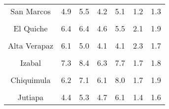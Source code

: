 \begin{tabular}[t]{ccccccc}
San Marcos & 4.9 & 5.5 & 4.2 & 5.1 & 1.2 & 1.3\\
\cellcolor[HTML]{B6B3FF}{Huehuetenango} & \cellcolor[HTML]{B6B3FF}{8.8} & \cellcolor[HTML]{B6B3FF}{9.4} & \cellcolor[HTML]{B6B3FF}{6.5} & \cellcolor[HTML]{B6B3FF}{7.8} & \cellcolor[HTML]{B6B3FF}{2.4} & \cellcolor[HTML]{B6B3FF}{2.3}\\
El Quiche & 6.4 & 6.4 & 4.6 & 5.5 & 2.1 & 1.9\\
\cellcolor[HTML]{B6B3FF}{Baja Verapaz} & \cellcolor[HTML]{B6B3FF}{5.3} & \cellcolor[HTML]{B6B3FF}{5.6} & \cellcolor[HTML]{B6B3FF}{5.3} & \cellcolor[HTML]{B6B3FF}{5.9} & \cellcolor[HTML]{B6B3FF}{1.8} & \cellcolor[HTML]{B6B3FF}{1.7}\\
Alta Verapaz & 6.1 & 5.0 & 4.1 & 4.1 & 2.3 & 1.7\\
\cellcolor[HTML]{B6B3FF}{Petén} & \cellcolor[HTML]{B6B3FF}{12.0} & \cellcolor[HTML]{B6B3FF}{13.2} & \cellcolor[HTML]{B6B3FF}{11.1} & \cellcolor[HTML]{B6B3FF}{12.8} & \cellcolor[HTML]{B6B3FF}{3.2} & \cellcolor[HTML]{B6B3FF}{3.5}\\
Izabal & 7.3 & 8.4 & 6.3 & 7.7 & 1.7 & 1.8\\
\cellcolor[HTML]{B6B3FF}{Zacapa} & \cellcolor[HTML]{B6B3FF}{8.0} & \cellcolor[HTML]{B6B3FF}{9.7} & \cellcolor[HTML]{B6B3FF}{5.3} & \cellcolor[HTML]{B6B3FF}{6.7} & \cellcolor[HTML]{B6B3FF}{2.1} & \cellcolor[HTML]{B6B3FF}{2.5}\\
Chiquimula & 6.2 & 7.1 & 6.1 & 8.0 & 1.7 & 1.9\\
\cellcolor[HTML]{B6B3FF}{Jalapa} & \cellcolor[HTML]{B6B3FF}{7.1} & \cellcolor[HTML]{B6B3FF}{7.8} & \cellcolor[HTML]{B6B3FF}{7.1} & \cellcolor[HTML]{B6B3FF}{8.0} & \cellcolor[HTML]{B6B3FF}{1.7} & \cellcolor[HTML]{B6B3FF}{1.6}\\
Jutiapa & 4.4 & 5.3 & 4.7 & 6.1 & 1.4 & 1.6\\
\bottomrule
\end{tabular}

